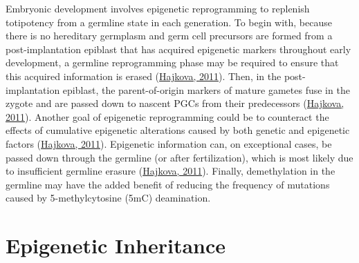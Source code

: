 \documentclass[12pt,twoside]{reedthesis}
\begin{document}
Embryonic development involves epigenetic reprogramming to replenish
totipotency from a germline state in each generation. To begin with,
because there is no hereditary germplasm and germ cell precursors are
formed from a post-implantation epiblast that has acquired epigenetic
markers throughout early development, a germline reprogramming phase may
be required to ensure that this acquired information is erased
(\protect\hyperlink{ref-hajkova2011}{Hajkova, 2011}). Then, in the post-implantation epiblast, the
parent-of-origin markers of mature gametes fuse in the zygote and are
passed down to nascent PGCs from their predecessors (\protect\hyperlink{ref-hajkova2011}{Hajkova, 2011}).
Another goal of epigenetic reprogramming could be to counteract the
effects of cumulative epigenetic alterations caused by both genetic and
epigenetic factors (\protect\hyperlink{ref-hajkova2011}{Hajkova, 2011}). Epigenetic information can, on
exceptional cases, be passed down through the germline (or after
fertilization), which is most likely due to insufficient germline
erasure (\protect\hyperlink{ref-hajkova2011}{Hajkova, 2011}). Finally, demethylation in the germline may have
the added benefit of reducing the frequency of mutations caused by
5-methylcytosine (5mC) deamination.

\hypertarget{epigenetic-inheritance}{%
\section*{Epigenetic Inheritance}\label{epigenetic-inheritance}}
\end{document}
